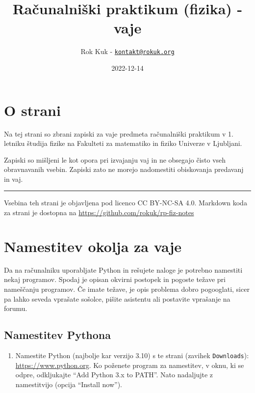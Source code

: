 \documentclass[
]{report}
\title{Računalniški praktikum (fizika) - vaje}
\author{Rok Kuk - \href{mailto:kontakt@rokuk.org}{\nolinkurl{kontakt@rokuk.org}}}
\date{2022-12-14}
\providecommand{\tightlist}{%
  \setlength{\itemsep}{0pt}\setlength{\parskip}{0pt}}
\begin{document}
\maketitle

{
\setcounter{tocdepth}{1}
\tableofcontents
}
\hypertarget{o-strani}{%
\chapter*{O strani}\label{o-strani}}

Na tej strani so zbrani zapiski za vaje predmeta računalniški praktikum v 1. letniku študija fizike na Fakulteti za matematiko in fiziko Univerze v Ljubljani.

Zapiski so mišljeni le kot opora pri izvajanju vaj in ne obsegajo čisto vseh obravnavanih vsebin. Zapiski zato ne morejo nadomestiti obiskovanja predavanj in vaj.

\begin{center}\rule{0.5\linewidth}{0.5pt}\end{center}

Vsebina teh strani je objavljena pod licenco CC BY-NC-SA 4.0.
Markdown koda za strani je dostopna na \url{https://github.com/rokuk/rp-fiz-notes}

\hypertarget{namestitev-okolja-za-vaje}{%
\chapter{Namestitev okolja za vaje}\label{namestitev-okolja-za-vaje}}

Da na računalniku uporabljate Python in rešujete naloge je potrebno namestiti
nekaj programov. Spodaj je opisan okvirni postopek in pogoste težave pri nameščanju
programov. Če imate težave, je opis problema dobro pogooglati, sicer pa lahko seveda vprašate sošolce, pišite
asistentu ali postavite vprašanje na forumu.

\hypertarget{namestitev-pythona}{%
\section{Namestitev Pythona}\label{namestitev-pythona}}

\begin{enumerate}
\def\labelenumi{\arabic{enumi}.}
\tightlist
\item
  Namestite Python (najbolje kar verzijo 3.10) s te strani (zavihek \texttt{Downloads}): \url{https://www.python.org}. Ko poženete program za namestitev, v oknu, ki se odpre, odkljukajte ``Add Python 3.x to PATH''. Nato nadaljujte z namestitvijo (opcija ``Install now'').
\end{enumerate}
\end{document}
